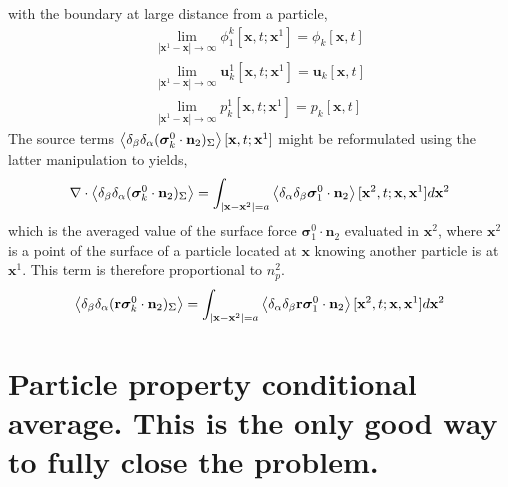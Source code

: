 with the boundary at large distance from a particle, 
\begin{align*}
    \lim_{|\textbf{x}^1 - \textbf{x}| \to \infty} \phi_1^k[\textbf{x},t;\textbf{x}^1] = \phi_k[\textbf{x},t]\\
    \lim_{|\textbf{x}^1 - \textbf{x}| \to \infty} \textbf{u}_k^1[\textbf{x},t;\textbf{x}^1] = \textbf{u}_k[\textbf{x},t]\\
    \lim_{|\textbf{x}^1 - \textbf{x}| \to \infty} p_k^1[\textbf{x},t;\textbf{x}^1] = p_k[\textbf{x},t]
\end{align*}
The source terms $\left<\delta_\beta\delta_\alpha ( \bm\sigma_k^0 \cdot \textbf{n}_2 )_{\Sigma}\right>[\textbf{x},t;\textbf{x}^1]$ might be reformulated using the latter manipulation to yields, 
\begin{equation*}
    \mathbf{\nabla}\cdot \left<\delta_\beta\delta_\alpha ( \bm\sigma_k^0 \cdot \textbf{n}_2 )_{\Sigma}\right>
    = 
    \int_{|\textbf{x}-\textbf{x}^2| = a}
    \left<\delta_\alpha \delta_\beta \bm\sigma_1^0\cdot\textbf{n}_2\right>
    [\textbf{x}^2,t;\textbf{x},\textbf{x}^1]
    d\textbf{x}^2
\end{equation*}
which is the averaged value of the surface force $\bm\sigma_1^0\cdot\textbf{n}_2$ evaluated in $\textbf{x}^2$, where $\textbf{x}^2$ is a point of the surface of a particle located at $\textbf{x}$ knowing another particle is at $\textbf{x}^1$.
This term is therefore proportional to $n_p^2$.  
\begin{equation*}
    \left<\delta_\beta\delta_\alpha ( \textbf{r}\bm\sigma_k^0 \cdot \textbf{n}_2 )_{\Sigma}\right>
    = 
    \int_{|\textbf{x}-\textbf{x}^2| = a}
    \left<\delta_\alpha \delta_\beta  \textbf{r}\bm\sigma_1^0\cdot\textbf{n}_2\right>
    [\textbf{x}^2,t;\textbf{x},\textbf{x}^1]
    d\textbf{x}^2
\end{equation*}



\section*{Particle property conditional average. This is the only good way to fully close the problem. }

